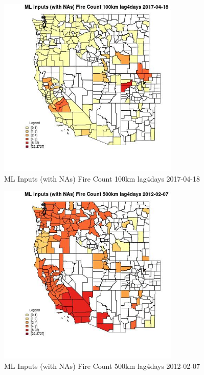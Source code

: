 \begin{figure} 
\centering  
\includegraphics[width=0.77\textwidth]{Code_Outputs/Report_ML_input_PM25_Step4_part_f_de_duplicated_aveswNAs_CountyFire_Count_100km_lag4daysMean2017-04-18.jpg} 
\caption{\label{fig:Report_ML_input_PM25_Step4_part_f_de_duplicated_aveswNAsCountyFire_Count_100km_lag4daysMean2017-04-18}ML Inputs (with NAs) Fire Count 100km lag4days 2017-04-18} 
\end{figure} 
 

\begin{figure} 
\centering  
\includegraphics[width=0.77\textwidth]{Code_Outputs/Report_ML_input_PM25_Step4_part_f_de_duplicated_aveswNAs_CountyFire_Count_500km_lag4daysMean2012-02-07.jpg} 
\caption{\label{fig:Report_ML_input_PM25_Step4_part_f_de_duplicated_aveswNAsCountyFire_Count_500km_lag4daysMean2012-02-07}ML Inputs (with NAs) Fire Count 500km lag4days 2012-02-07} 
\end{figure} 
 

